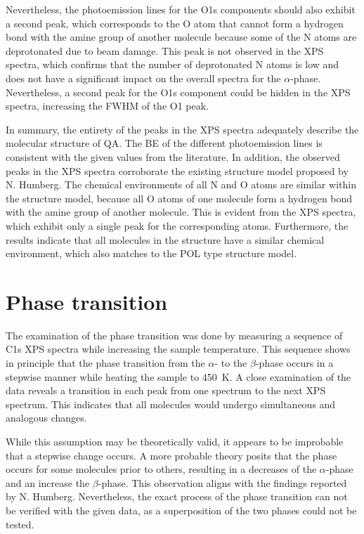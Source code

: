 Nevertheless, the photoemission lines for the O1s components should also exhibit a second peak, which corresponds to the O atom that cannot form a hydrogen bond with the amine group of another molecule because some of the N atoms are deprotonated due to beam damage. This peak is not observed in the \ac{XPS} spectra, which confirms that the number of deprotonated N atoms is low and does not have a significant impact on the overall spectra for the $\alpha$-phase. Nevertheless, a second peak for the O1s component could be hidden in the \ac{XPS} spectra, increasing the \ac{FWHM} of the O1 peak.

In summary, the entirety of the peaks in the \ac{XPS} spectra adequately describe the molecular structure of \ac{QA}. The \ac{BE} of the different photoemission lines is consistent with the given values from the literature. In addition, the observed peaks in the \ac{XPS} spectra corroborate the existing structure model proposed by N. Humberg.\autocite{Humberg2024} The chemical environments of all N and O atoms are similar within the structure model, because all O atoms of one molecule form a hydrogen bond with the amine group of another molecule. This is evident from the \ac{XPS} spectra, which exhibit only a single peak for the corresponding atoms. Furthermore, the results indicate that all molecules in the structure have a similar chemical environment, which also matches to the \ac{POL} type structure model.

\section{Phase transition}

The examination of the phase transition was done by measuring a sequence of C1s \ac{XPS} spectra while increasing the sample temperature. This sequence shows in principle that the phase transition from the $\alpha$- to the $\beta$-phase occurs in a stepwise manner while heating the sample to 450~\si{K}. A close examination of the data reveals a transition in each peak from one spectrum to the next \ac{XPS} spectrum. This indicates that all molecules would undergo simultaneous and analogous changes.

While this assumption may be theoretically valid, it appears to be improbable that a stepwise change occurs. A more probable theory posits that the phase occurs for some molecules prior to others, resulting in a decreases of the $\alpha$-phase and an increase the $\beta$-phase. This observation aligns with the findings reported by N. Humberg.\autocite{Humberg2024} Nevertheless, the exact process of the phase transition can not be verified with the given data, as a superposition of the two phases could not be tested.

